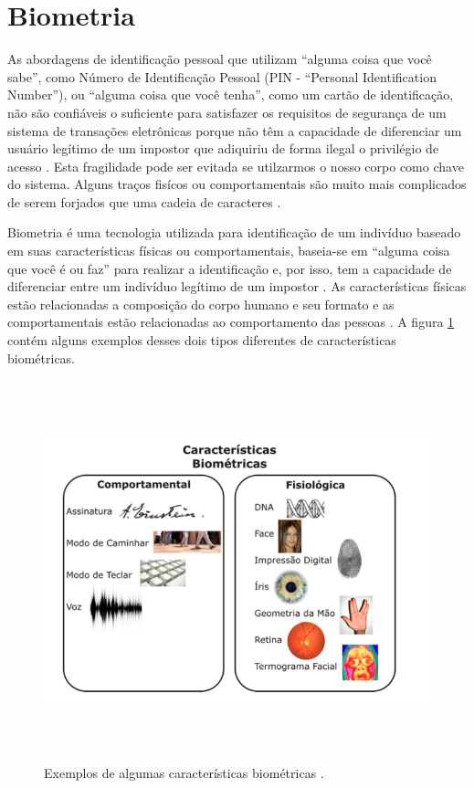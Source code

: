 \section{Biometria}

As abordagens de identificação pessoal que utilizam ``alguma coisa que você sabe'', como Número de Identificação Pessoal (PIN - ``Personal Identification Number''), ou ``alguma coisa que você tenha'', como um cartão de identificação, não são confiáveis o suficiente para satisfazer os requisitos de segurança de um sistema de transações eletrônicas porque não têm a capacidade de diferenciar um usuário legítimo de um impostor que adiquiriu de forma ilegal o privilégio de acesso \cite{hong}. Esta fragilidade pode ser evitada se utilzarmos o nosso corpo como chave do sistema. Alguns traços fisícos ou comportamentais são muito mais complicados de serem forjados que uma cadeia de caracteres \cite{drovetto}.

Biometria é uma tecnologia utilizada para identificação de um indivíduo baseado em suas características físicas ou comportamentais, baseia-se em ``alguma coisa que você é ou faz'' para realizar a identificação e, por isso, tem a capacidade de diferenciar entre um indivíduo legítimo de um impostor \cite{hong}. As características físicas estão relacionadas a composição do corpo humano e seu formato e as comportamentais estão relacionadas ao comportamento das pessoas \cite{drovetto}. A figura \ref{caracteristicasBiometricas} contém alguns exemplos desses dois tipos diferentes de características biométricas.

	\begin{figure}[hbt]
		\begin{center}
			\includegraphics[height=11cm,width=17cm]{figuras/2.FundamentacaoTeorica/caracteristicasBiometricas.png}
		\end{center}
		\caption{Exemplos de algumas características biométricas \cite{drovetto}.}
		\label{caracteristicasBiometricas}
	\end{figure}

